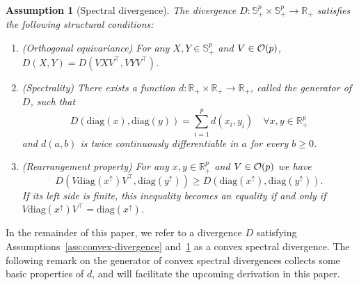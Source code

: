 \documentclass[11pt]{article}
\def\R{\mathbb{R}}
\def\S{\mathbb{S}}
\def\PSD{{\S^k_{++}}}
\newtheorem{assumption}{Assumption}
\def\diag{\mathrm{diag}}
\def\transpose{\top}
\def\R{\mathbb{R}}
\def\S{\mathbb{S}}
\def\PSD{{\S^p_{+}}}
\begin{document}
\begin{assumption}[Spectral divergence]\label{ass:Spectral-divergence} 
The divergence $D:\PSD\times \PSD\to \R_+$ satisfies the following structural conditions:
        \begin{enumerate}[label=(\roman*)]
    \item (Orthogonal equivariance) For any $X,Y\in\PSD$ and $V\in{\cal O}(p)$, $D(X,Y)=D(VXV^\transpose, VYV^\transpose)$.
    
    \item (Spectrality) There exists a function $d:\R_+\times \R_+\to \R_+$, called the generator of $D$, such that
    \[
        D(\diag(x),\diag(y))=\sum_{i=1}^p d(x_i,y_i) \quad  \forall x,y\in \R_+^p
    \]
    and $d(a,b)$ is twice continuously differentiable in $a$ for every $b \geq 0$.  
    \item (Rearrangement property) For any $x,y\in \R_+^p$ and $V\in{\cal O}(p)$ we have
    \[
        D(V\diag(x^{\uparrow})V^\transpose, \diag(y^{\uparrow})) \geq D(\diag(x^{\uparrow}), \diag(y^{\uparrow})).
    \]
    If its left side is finite, this inequality becomes an equality if and only if $V\diag(x^{\uparrow})V^\transpose=\diag(x^{\uparrow})$.
\end{enumerate}

\end{assumption}

In the remainder of this paper, we refer to a divergence $D$ satisfying Assumptions~\ref{ass:convex-divergence} and~\ref{ass:Spectral-divergence} as a convex spectral divergence.
The following remark on the generator of convex spectral divergences collects some basic properties of $d$, and will facilitate the upcoming derivation in this paper. 
\end{document}
